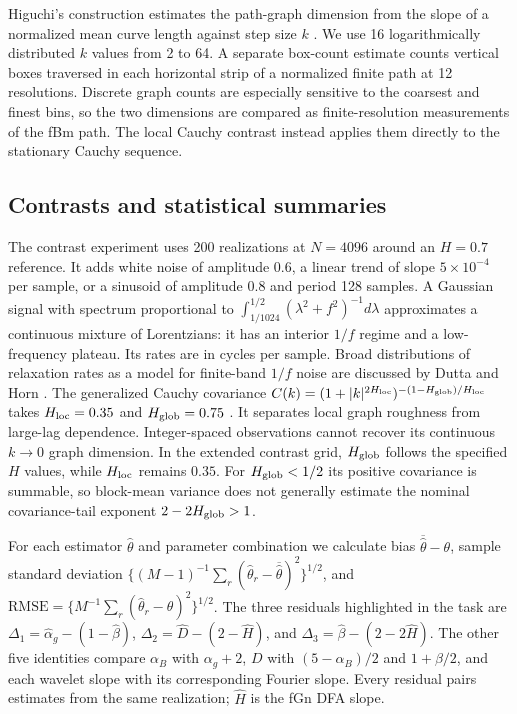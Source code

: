 \documentclass[12pt,twocolumn]{article}
\begin{document}
Higuchi's construction estimates the path-graph dimension from the slope of a normalized mean curve length against step size $k$ \cite{higuchi1988}. We use 16 logarithmically distributed $k$ values from 2 to 64. A separate box-count estimate counts vertical boxes traversed in each horizontal strip of a normalized finite path at 12 resolutions. Discrete graph counts are especially sensitive to the coarsest and finest bins, so the two dimensions are compared as finite-resolution measurements of the fBm path. The local Cauchy contrast instead applies them directly to the stationary Cauchy sequence.

\subsection{Contrasts and statistical summaries}

The contrast experiment uses 200 realizations at $N=4096$ around an $H=0.7$ reference. It adds white noise of amplitude $0.6$, a linear trend of slope $5\times10^{-4}$ per sample, or a sinusoid of amplitude $0.8$ and period 128 samples. A Gaussian signal with spectrum proportional to $\int_{1/1024}^{1/2}(\lambda^2+f^2)^{-1}d\lambda$ approximates a continuous mixture of Lorentzians: it has an interior $1/f$ regime and a low-frequency plateau. Its rates are in cycles per sample. Broad distributions of relaxation rates as a model for finite-band $1/f$ noise are discussed by Dutta and Horn \cite{dutta1981}. The generalized Cauchy covariance $C(k)=(1+|k|^{2H_{\rm loc}})^{-(1-H_{\rm glob})/H_{\rm loc}}$ takes $H_{\rm loc}=0.35$ and $H_{\rm glob}=0.75$ \cite{gneiting2004}. It separates local graph roughness from large-lag dependence. Integer-spaced observations cannot recover its continuous $k\to0$ graph dimension. In the extended contrast grid, $H_{\rm glob}$ follows the specified $H$ values, while $H_{\rm loc}$ remains $0.35$. For $H_{\rm glob}<1/2$ its positive covariance is summable, so block-mean variance does not generally estimate the nominal covariance-tail exponent $2-2H_{\rm glob}>1$.

For each estimator $\widehat\theta$ and parameter combination we calculate bias $\overline{\widehat\theta}-\theta$, sample standard deviation $\{(M-1)^{-1}\sum_r(\widehat\theta_r-\overline{\widehat\theta})^2\}^{1/2}$, and $\mathrm{RMSE}=\{M^{-1}\sum_r(\widehat\theta_r-\theta)^2\}^{1/2}$. The three residuals highlighted in the task are $\Delta_1=\widehat\alpha_g-(1-\widehat\beta)$, $\Delta_2=\widehat D-(2-\widehat H)$, and $\Delta_3=\widehat\beta-(2-2\widehat H)$. The other five identities compare $\alpha_B$ with $\alpha_g+2$, $D$ with $(5-\alpha_B)/2$ and $1+\beta/2$, and each wavelet slope with its corresponding Fourier slope. Every residual pairs estimates from the same realization; $\widehat H$ is the fGn DFA slope.
\end{document}
